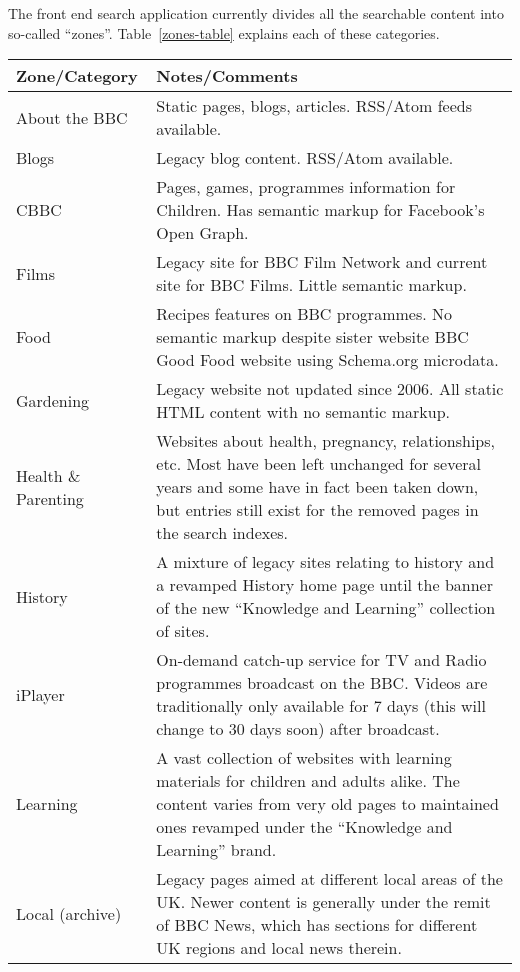 The front end search application currently divides all the searchable
content into so-called ``zones''. Table~\ref{zones-table} explains
each of these categories.

\begin{sidewaystable}
  \centering
\begin{tabular}{| p{5cm} | p{16cm} |}
  \hline
  Zone/Category          & Notes/Comments \\
  \hline
  About the BBC          &  Static pages, blogs, articles. RSS/Atom feeds available. \\
  \hline
  Blogs                  &  Legacy blog content. RSS/Atom available. \\
  \hline
  CBBC                   &  Pages, games, programmes information for Children. Has semantic markup for Facebook's Open Graph. \\
  \hline
  Films                  &  Legacy site for BBC Film Network and current site for BBC Films. Little semantic markup. \\
  \hline
  Food                   &  Recipes features on BBC programmes. No semantic markup despite sister website BBC Good Food website using Schema.org microdata. \\
  \hline
  Gardening              &  Legacy website not updated since 2006. All static HTML content with no semantic markup. \\
  \hline
  Health \& Parenting    &  Websites about health, pregnancy, relationships, etc. Most have been left unchanged for several years and some have in fact been taken down, but entries still exist for the removed pages in the search indexes. \\
  \hline
  History                &  A mixture of legacy sites relating to history and a revamped History home page until the banner of the new ``Knowledge and Learning'' collection of sites. \\
  \hline
  iPlayer                &  On-demand catch-up service for TV and Radio programmes broadcast on the BBC. Videos are traditionally only available for 7 days (this will change to 30 days soon) after broadcast. \\
  \hline
  Learning               &  A vast collection of websites with learning materials for children and adults alike. The content varies from very old pages to maintained ones revamped under the ``Knowledge and Learning'' brand.\\
  \hline
  Local (archive)        &  Legacy pages aimed at different local areas of the UK. Newer content is generally under the remit of BBC News, which has sections for different UK regions and local news therein. \\

\end{tabular}
\end{sidewaystable}
